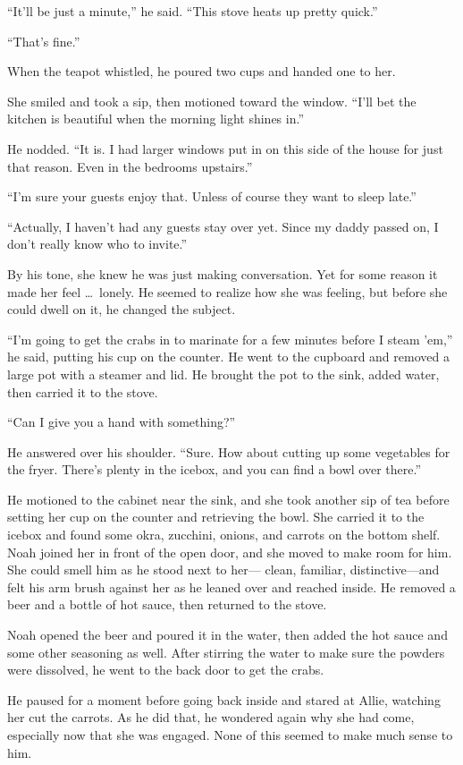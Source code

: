 \documentclass[10pt, twoside, openright]{book}
\begin{document}
``It'll be just a minute,'' he said. ``This stove heats up pretty
quick.''

``That's fine.''

When the teapot whistled, he poured two cups and handed one to her.


She smiled and took a sip, then motioned toward the window. ``I'll bet
the kitchen is beautiful when the morning light shines in.''

He nodded. ``It is. I had larger windows put in on this side of the
house for just that reason. Even in the bedrooms upstairs.''

``I'm sure your guests enjoy that. Unless of course they want to sleep
late.''

``Actually, I haven't had any guests stay over yet. Since my daddy
passed on, I don't really know who to invite.''

By his tone, she knew he was just making conversation. Yet for some
reason it made her feel   \dots\ lonely. He seemed to realize how she was
feeling, but before she could dwell on it, he changed the subject.

``I'm going to get the crabs in to marinate for a few minutes before I
steam 'em,'' he said, putting his cup on the counter. He went to the
cupboard and removed a large pot with a steamer and lid. He brought the
pot to the sink, added water, then carried it to the stove.


``Can I give you a hand with something?''


He answered over his shoulder. ``Sure. How about cutting up some
vegetables for the fryer. There's plenty in the icebox, and you can find
a bowl over there.''

He motioned to the cabinet near the sink, and she took another sip of
tea before setting her cup on the counter and retrieving the bowl. She
carried it to the icebox and found some okra, zucchini, onions, and
carrots on the bottom shelf. Noah joined her in front of the open door,
and she moved to make room for him. She could smell him as he stood next
to her--- clean, familiar, distinctive---and felt his arm brush against
her as he leaned over and reached inside. He removed a beer and a bottle
of hot sauce, then returned to the stove.

Noah opened the beer and poured it in the water, then added the hot
sauce and some other seasoning as well. After stirring the water to make
sure the powders were dissolved, he went to the back door to get the
crabs.

He paused for a moment before going back inside and stared at Allie,
watching her cut the carrots. As he did that, he wondered again why she
had come, especially now that she was engaged. None of this seemed to
make much sense to him.
\end{document}
